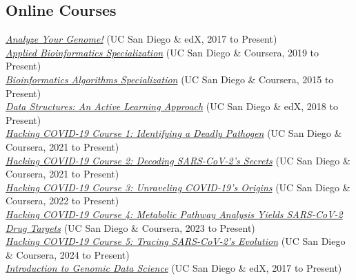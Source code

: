 \documentclass[margin,line]{res}
\begin{document}
\begin{resume}
\section{\sc Online Courses}
\href{https://www.edx.org/course/analyze-genome-uc-san-diegox-binf180-1}{\textit{Analyze Your Genome!}} (UC San Diego \& edX, 2017 to Present)\vspace{2mm}\\
\href{https://www.coursera.org/specializations/applied-bioinformatics}{\textit{Applied Bioinformatics Specialization}} (UC San Diego \& Coursera, 2019 to Present)\vspace{2mm}\\
\href{https://www.coursera.org/specializations/bioinformatics}{\textit{Bioinformatics Algorithms Specialization}} (UC San Diego \& Coursera, 2015 to Present)\vspace{2mm}\\
\href{https://www.edx.org/course/data-structures-an-active-learning-approach}{\textit{Data Structures: An Active Learning Approach}} (UC San Diego \& edX, 2018 to Present)\vspace{2mm}\\
\href{https://www.coursera.org/learn/covid-19-genome-assembly}{\textit{Hacking COVID-19 Course 1: Identifying a Deadly Pathogen}} (UC San Diego \& Coursera, 2021 to Present)\vspace{2mm}\\
\href{https://www.coursera.org/learn/covid-19-genome-annotation}{\textit{Hacking COVID-19 Course 2: Decoding SARS-CoV-2's Secrets}} (UC San Diego \& Coursera, 2021 to Present)\vspace{2mm}\\
\href{https://www.coursera.org/learn/hacking-covid-19--course-3-unraveling-origins-of-covid-19}{\textit{Hacking COVID-19 Course 3: Unraveling COVID-19's Origins}} (UC San Diego \& Coursera, 2022 to Present)\vspace{2mm}\\
\href{https://www.coursera.org/learn/hacking-covid-19--course-4-searching-for-drug-targets}{\textit{Hacking COVID-19 Course 4: Metabolic Pathway Analysis Yields SARS-CoV-2 Drug Targets}} (UC San Diego \& Coursera, 2023 to Present)\vspace{2mm}\\
\href{https://www.coursera.org/learn/hacking-covid-19--course-5-tracing-sars-cov-2s-evolution}{\textit{Hacking COVID-19 Course 5: Tracing SARS-CoV-2's Evolution}} (UC San Diego \& Coursera, 2024 to Present)\vspace{2mm}\\
\href{https://www.edx.org/course/introduction-genomic-data-science-uc-san-diegox-cse181-1x}{\textit{Introduction to Genomic Data Science}} (UC San Diego \& edX, 2017 to Present)


\end{resume}
\end{document}
